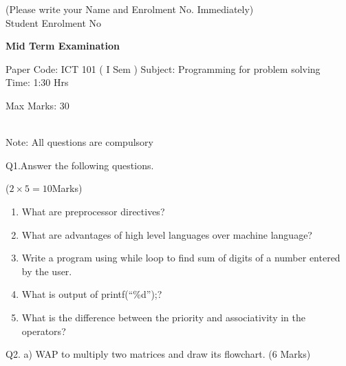 \documentclass[12pt,a4paper]{article}
\begin{document}
    \noindent (Please write your Name and Enrolment No. Immediately) \\
    Student Enrolment No\dotuline{\hspace{150pt}}

    \begin{center}
        \textbf{\Large Mid Term Examination}
    \end{center}

    Paper Code: ICT 101 ( I Sem ) \hfill Subject: Programming for problem solving \\
    Time: 1:30 Hrs \hfill \parbox{220pt}{\centering Max Marks: 30}\\

    Note: All questions are compulsory

    Q1.Answer the following questions.

    \vspace{-20pt}\hfill ($2 \times 5 = 10$Marks)
    \begin{enumerate}[label=\textbf{\alph*}),noitemsep]
        \singlespacing
        \item What are preprocessor directives?
        \item What are advantages of high level languages over machine language?
        \item Write a program using while loop to find sum of digits of a number entered by the user.
        \item What is output of printf(``\%d'');?
        \item What is the difference between the priority and associativity in the operators?
    \end{enumerate}

    Q2. a) WAP to multiply two matrices and draw its flowchart. \hfill (6 Marks)\\
\end{document}
